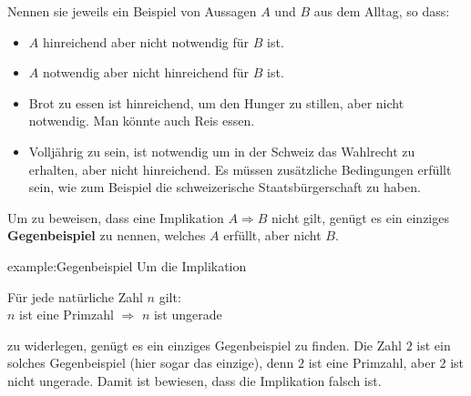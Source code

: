 \begin{myexercise}%
	\noindent
	Nennen sie jeweils ein Beispiel von Aussagen $A$ und $B$ aus dem Alltag, so dass:
	\begin{itemize}
		\item $A$ hinreichend aber nicht notwendig für $B$ ist.
		\item $A$ notwendig aber nicht hinreichend für $B$ ist.
	\end{itemize}
	\vspace{0.4cm}
\end{myexercise}
\begin{myanswer}
	\begin{itemize}
		\item Brot zu essen ist hinreichend, um den Hunger zu stillen, aber nicht notwendig. Man könnte auch Reis essen.
		\item Volljährig zu sein, ist notwendig um in der Schweiz das Wahlrecht zu erhalten, aber nicht hinreichend. Es müssen zusätzliche Bedingungen erfüllt sein, wie zum Beispiel die schweizerische Staatsbürgerschaft zu haben.
	\end{itemize}
	\noindent
\end{myanswer}

\noindent
Um zu beweisen, dass eine Implikation $A \Rightarrow B$ nicht gilt, genügt es ein einziges \textbf{Gegenbeispiel} zu nennen, welches $A$ erfüllt, aber nicht $B$.\\
\begin{example}{example:Gegenbeispiel}
	Um die Implikation
	\begin{center}
		Für jede natürliche Zahl $n$ gilt:\\
		$n$ ist eine Primzahl $\Rightarrow$ $n$ ist ungerade
	\end{center}
	zu widerlegen, genügt es ein einziges Gegenbeispiel zu finden. Die Zahl $2$ ist ein solches Gegenbeispiel (hier sogar das einzige), denn $2$ ist eine Primzahl, aber $2$ ist nicht ungerade. Damit ist bewiesen, dass die Implikation falsch ist.
\end{example}

